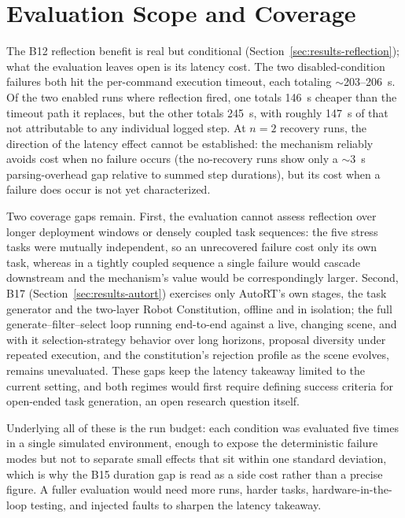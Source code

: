 \documentclass[
     12pt,
     a4paper,
     BCOR=10mm,
     DIV=14,
     listof=totoc,
     bibliography=totoc,
     parskip,
     twoside,
     headsepline
     ]{scrreprt}
\begin{document}
\section{Evaluation Scope and Coverage}
The B12 reflection benefit is real but conditional (Section~\ref{sec:results-reflection}); what the evaluation leaves open is its latency cost. The two disabled-condition failures both hit the per-command execution timeout, each totaling $\sim$203--206~s. Of the two enabled runs where reflection fired, one totals 146~s cheaper than the timeout path it replaces, but the other totals 245~s, with roughly 147~s of that not attributable to any individual logged step. At $n=2$ recovery runs, the direction of the latency effect cannot be established: the mechanism reliably avoids cost when no failure occurs (the no-recovery runs show only a $\sim$3~s parsing-overhead gap relative to summed step durations), but its cost when a failure does occur is not yet characterized.

Two coverage gaps remain. First, the evaluation cannot assess reflection over longer deployment windows or densely coupled task sequences: the five stress tasks were mutually independent, so an unrecovered failure cost only its own task, whereas in a tightly coupled sequence a single failure would cascade downstream and the mechanism's value would be correspondingly larger. Second, B17 (Section~\ref{sec:results-autort}) exercises only AutoRT's own stages, the task generator and the two-layer Robot Constitution, offline and in isolation; the full generate--filter--select loop running end-to-end against a live, changing scene, and with it selection-strategy behavior over long horizons, proposal diversity under repeated execution, and the constitution's rejection profile as the scene evolves, remains unevaluated. These gaps keep the latency takeaway limited to the current setting, and both regimes would first require defining success criteria for open-ended task generation, an open research question itself.

Underlying all of these is the run budget: each condition was evaluated five times in a single simulated environment, enough to expose the deterministic failure modes but not to separate small effects that sit within one standard deviation, which is why the B15 duration gap is read as a side cost rather than a precise figure. A fuller evaluation would need more runs, harder tasks, hardware-in-the-loop testing, and injected faults to sharpen the latency takeaway.
\end{document}

